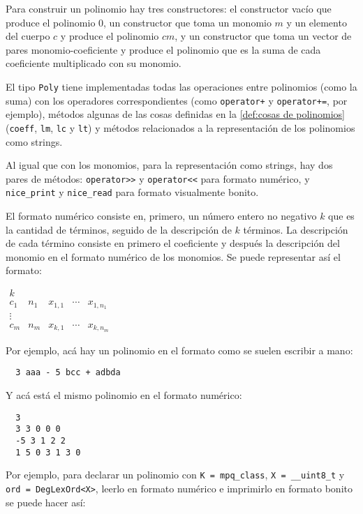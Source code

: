 \documentclass[12pt]{report}
\theoremstyle{customstyle}
\theoremstyle{factstyle}
\begin{document}
Para construir un polinomio hay tres constructores: el constructor vacío que produce el polinomio $0$, un constructor que toma un monomio $m$ y un elemento del cuerpo $c$ y produce el polinomio $cm$, y un constructor que toma un vector de pares monomio-coeficiente y produce el polinomio que es la suma de cada coeficiente multiplicado con su monomio.

El tipo \texttt{Poly} tiene implementadas todas las operaciones entre polinomios (como la suma) con los operadores correspondientes (como \texttt{operator+} y \texttt{operator+=}, por ejemplo), métodos algunas de las cosas definidas en la \cref{def:cosas de polinomios} (\texttt{coeff}, \texttt{lm}, \texttt{lc} y \texttt{lt}) y métodos relacionados a la representación de los polinomios como strings. %

Al igual que con los monomios, para la representación como strings, hay dos pares de métodos: \texttt{operator>>} y \texttt{operator<<} para formato numérico, y \texttt{nice\_print} y \texttt{nice\_read} para formato visualmente bonito.

El formato numérico consiste en, primero, un número entero no negativo $k$ que es la cantidad de términos, seguido de la descripción de $k$ términos. La descripción de cada término consiste en primero el coeficiente y después la descripción del monomio en el formato numérico de los monomios. Se puede representar así el formato:

$\begin{array}{llllll}
  k &&&& \\
  c_1 & n_1 & x_{1, 1} & ⋯ & x_{1, n_1} \\
  ⋮ &&&& \\
  c_m & n_m & x_{k, 1} & ⋯ & x_{k, n_m}
\end{array}$

Por ejemplo, acá hay un polinomio en el formato como se suelen escribir a mano:

\begin{lstlisting}
  3 aaa - 5 bcc + adbda
\end{lstlisting}

\noindent Y acá está el mismo polinomio en el formato numérico:

\begin{lstlisting}
  3
  3 3 0 0 0
  -5 3 1 2 2
  1 5 0 3 1 3 0
\end{lstlisting}

Por ejemplo, para declarar un polinomio con \texttt{K = mpq\_class}, \texttt{X = \_\_uint8\_t} y \texttt{ord = DegLexOrd<X>}, leerlo en formato numérico e imprimirlo en formato bonito se puede hacer así:
\end{document}
